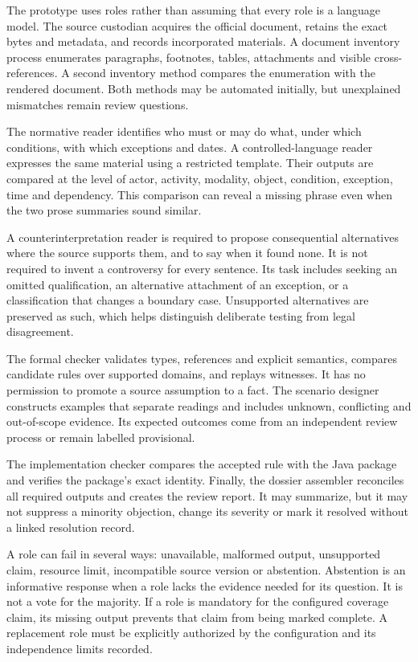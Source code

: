 \documentclass[12pt,a4paper,oneside,openany]{book}
\begin{document}
The prototype uses roles rather than assuming that every role is a language
model. The source custodian acquires the official document, retains the exact
bytes and metadata, and records incorporated materials. A document inventory
process enumerates paragraphs, footnotes, tables, attachments and visible
cross-references. A second inventory method compares the enumeration with the
rendered document. Both methods may be automated initially, but unexplained
mismatches remain review questions.

The normative reader identifies who must or may do what, under which conditions,
with which exceptions and dates. A controlled-language reader expresses the same
material using a restricted template. Their outputs are compared at the level
of actor, activity, modality, object, condition, exception, time and dependency.
This comparison can reveal a missing phrase even when the two prose summaries
sound similar.

A counterinterpretation reader is required to propose consequential alternatives
where the source supports them, and to say when it found none. It is not required
to invent a controversy for every sentence. Its task includes seeking an omitted
qualification, an alternative attachment of an exception, or a classification
that changes a boundary case. Unsupported alternatives are preserved as such,
which helps distinguish deliberate testing from legal disagreement.

The formal checker validates types, references and explicit semantics, compares
candidate rules over supported domains, and replays witnesses. It has no
permission to promote a source assumption to a fact. The scenario designer
constructs examples that separate readings and includes unknown, conflicting and
out-of-scope evidence. Its expected outcomes come from an independent review
process or remain labelled provisional.

The implementation checker compares the accepted rule with the Java package and
verifies the package's exact identity. Finally, the dossier assembler reconciles
all required outputs and creates the review report. It may summarize, but it may
not suppress a minority objection, change its severity or mark it resolved without
a linked resolution record.

A role can fail in several ways: unavailable, malformed output, unsupported
claim, resource limit, incompatible source version or abstention. Abstention is
an informative response when a role lacks the evidence needed for its question.
It is not a vote for the majority. If a role is mandatory for the configured
coverage claim, its missing output prevents that claim from being marked complete.
A replacement role must be explicitly authorized by the configuration and its
independence limits recorded.
\end{document}
